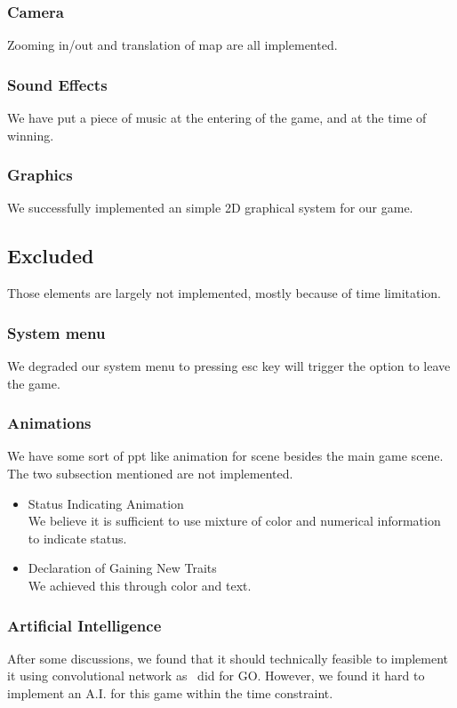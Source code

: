 	\subsubsection{Camera}
	Zooming in/out and translation of map are all implemented.

	\subsubsection{Sound Effects}
	We have put a piece of music at the entering of the game, and at the time of winning.
\subsubsection{Graphics}
We successfully implemented an simple 2D graphical system for our game.

\subsection{Excluded}
Those elements are largely not implemented, mostly because of time limitation.
\subsubsection{System menu}
We degraded our system menu to pressing esc key will trigger the option to leave the game.
\subsubsection{Animations}
We have some sort of ppt like animation for scene besides the main game scene. The two subsection mentioned are not implemented.
\begin{itemize}
\item Status Indicating Animation\\
We believe it is sufficient to use mixture of color and numerical information to indicate status.
\item Declaration of Gaining New Traits\\
We achieved this through color and text.
\end{itemize}


\subsubsection{Artificial Intelligence}
After some discussions, we found that it should technically feasible to implement it using convolutional network as~\cite{ClarkS14} did for GO.
However, we found it hard to implement an A.I. for this game within the time constraint. 

